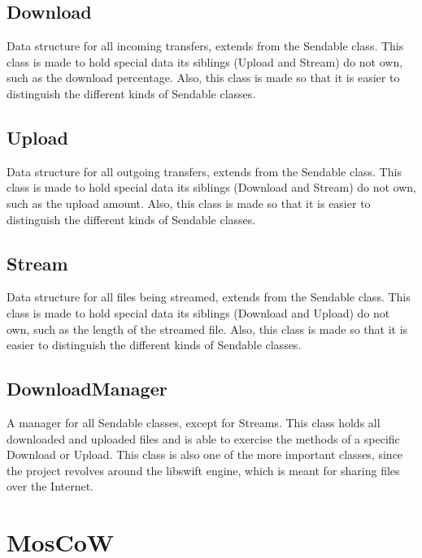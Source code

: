 \subsection{Download}
Data structure for all incoming transfers, extends from the Sendable class. This class is made to hold special data its siblings (Upload and Stream)
do not own, such as the download percentage. Also, this class is made so that it is easier to distinguish the different kinds of Sendable classes.

\subsection{Upload}
Data structure for all outgoing transfers, extends from the Sendable class. This class is made to hold special data its siblings (Download and Stream)
do not own, such as the upload amount. Also, this class is made so that it is easier to distinguish the different kinds of Sendable classes.

\subsection{Stream}
Data structure for all files being streamed, extends from the Sendable class. This class is made to hold special data its siblings (Download and Upload)
do not own, such as the length of the streamed file. Also, this class is made so that it is easier to distinguish the different kinds of Sendable classes.

\subsection{DownloadManager}
A manager for all Sendable classes, except for Streams. This class holds all downloaded and uploaded files and is able to exercise the methods 
of a specific Download or Upload. This class is also one of the more important classes, since the project revolves around the libswift engine, which
is meant for sharing files over the Internet.

\section{MosCoW}

